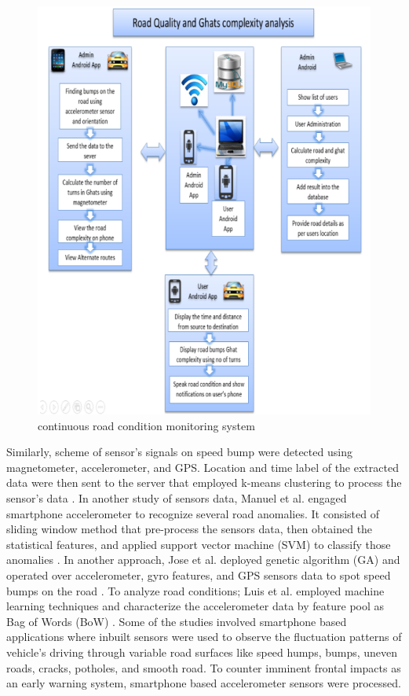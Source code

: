 \begin{figure}[h]
    \centering
    \includegraphics[scale=0.8]{Figures/chapter2/sensor1.png}
    \caption{continuous road condition monitoring system}
    \label{fig:sensor1}
\end{figure}

\noindent
Similarly, scheme of sensor’s signals on speed bump were detected using magnetometer, accelerometer, and GPS. Location and time label of the extracted data were then sent to the server that employed k-means clustering to process the sensor’s data \cite{R10}. In another study of sensors data, Manuel et al. engaged smartphone accelerometer to recognize several road anomalies. It consisted of sliding window method that pre-process the sensors data, then obtained the statistical features, and applied support vector machine (SVM) to classify those anomalies \cite{R6}. In another approach, Jose et al. deployed genetic algorithm (GA) and operated over accelerometer, gyro features, and GPS sensors data to spot speed bumps on the road \cite{R7}. To analyze road conditions; Luis et al. employed machine learning techniques and characterize the accelerometer data by feature pool as Bag of Words (BoW) \cite{R9}. Some of the studies involved smartphone based applications where inbuilt sensors were used to observe the fluctuation patterns of vehicle’s driving through variable road surfaces like speed humps, bumps, uneven roads, cracks, potholes, and smooth road. To counter imminent frontal impacts as an early warning system, smartphone based accelerometer sensors were processed.

